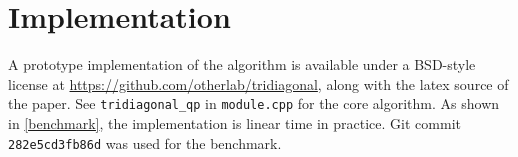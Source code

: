 \documentclass[11pt]{article}
\begin{document}
\section{Implementation}

A prototype implementation of the algorithm is available under a BSD-style license at \url{https://github.com/otherlab/tridiagonal}, along with the latex source of the paper.
See \verb+tridiagonal_qp+ in \verb+module.cpp+ for the core algorithm.  As shown in \cref{benchmark}, the implementation is linear time in practice.  Git commit 
\verb+282e5cd3fb86d+ was used for the benchmark.



\end{document}
